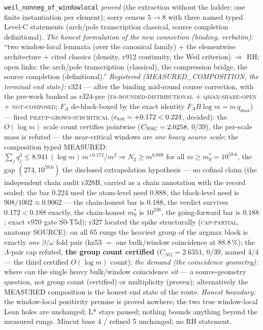 \documentclass[11pt,a4paper]{article}
\begin{document}
{\texttt{weil\_nonneg\_of\_windowlocal} \emph{proved} (the
extraction without the ladder: one finite instantiation per
element); sorry census $5 \to 8$ with three named typed Level-C
statements (arch/pole transcription classical, source completion
definitional).  \emph{The honest formulation of the new connection
(binding, verbatim):} ``two window-local lemmata (over the
canonical family) $+$ the elementwise architecture $+$ cited
classics (density, v912 continuity, the Weil criterion)
$\Rightarrow$ RH; open links: the arch/pole transcription
(classical), the compression bridge, the source completion
(definitional).''  \emph{Registered (MEASURED\_COMPOSITION, the
terminal end state):} r324 --- after the binding mid-round course
correction, with the pre-work banked as r324-pre
(\textsc{fa-bounded-distributional} $+$ \textsc{qmax-share-open}
$+$ \textsc{not-composed}; $F_A$ de-black-boxed by the exact
identity $F_A B \log m = m\,q_{\max}$) --- fired
\textsc{pileup-grows-subcritical} ($e_{\rm tot} = +0.172 < 0.224$,
decided): the $O(\log m)$ scale count certifies pointwise
($C_{\rm NSC} = 2.0258$, $0/39$), the per-scale mass is refuted
--- the near-critical windows are \emph{one heavy source scale};
the composition typed MEASURED: $\sum_j q_j^3 \le
8.941\,(\log m)\,m^{+0.172}/m^2 \Rightarrow N_2 \ge m^{0.888}$ for
all $m \ge m_0^* = 10^{59.6}$, the gap $(274, 10^{59.6})$ the
disclosed extrapolation hypothesis --- no cofinal claim (the
independent chain audit r328B, carried as a chain annotation with
the record sealed: the bar $0.224$ used the atom-level need
$0.888$, the block-level need is $908/1002 \approx 0.9062$ --- the
chain-honest bar is $0.188$, the verdict survives $0.172 < 0.188$
exactly, the chain-honest $m_0^*$ is $10^{238}$, the going-forward
bar is $0.188$; exact v970 gate S0-T5d); r327
located the spike structurally (\textsc{cap-partial}, anatomy
SOURCE): on all 65 rungs the heaviest group of the argmax block is
exactly \emph{one} $\beta/\omega$ fold pair (kz53 $=$ one
bulk/window coincidence at $88.8\,\%$); the $\Lambda$-pair cap
refuted, \textbf{the group count certified} ($C_{NG} = 2.6351$,
$0/39$, named $4/4$ --- the third certified $O(\log m)$ count);
\emph{the demand (the coincidence geometry):} where can the single
heavy bulk/window coincidence \emph{sit} --- a source-geometry
question, not group count (certified) or multiplicity (proven);
alternatively the MEASURED composition is the honest end state of
the route.  \emph{Honest boundary:} the window-local positivity
premise is proved nowhere; the two true window-local Lean holes
are unchanged; L* stays paused; nothing bounds anything beyond the
measured rungs.  Mincut base 4 / refined 5 unchanged; no RH
statement.\par}
\end{document}
